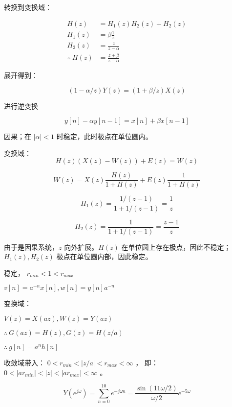 \documentclass[lang=cn,11pt,a4paper,cite=authoryear,twocolumn]{elegantpaper}
\begin{document}
转换到变换域：

\[\begin{aligned}
    H(z) &= H_1(z) H_2(z) +H_2(z)\\ 
    H_1(z) &= \beta \frac{1}{z} \\ 
    H_2(z) &= \frac{z}{z-\alpha} \\
    \therefore \: H(z) &= \frac{z + \beta}{z - \alpha}
\end{aligned}\]


展开得到：

\[(1-\alpha / z)Y(z) = (1 + \beta / z) X(z)\]

进行逆变换

\[y[n] - \alpha y[n-1] = x[n] + \beta x[n-1]\]


因果；在 \(|\alpha| < 1\) 时稳定，此时极点在单位圆内。



变换域：  \[H(z)(X(z)-W(z)) + E(z) = W(z)\]

\[W(z) = X(z) \frac{H(z)}{1+H(z)} + E(z) \frac{1}{1+H(z)}\]


\[H_1(z) = \frac{1/(z-1)}{1 + 1/(z-1)} = \frac{1}{z}\]

\[H_2(z) = \frac{1}{1 + 1 / (z-1)} = \frac{z-1}{z}\]


由于是因果系统，\(z\) 向外扩展。\(H(z)\) 在单位圆上存在极点，因此不稳定；\(H_1(z), H_2(z)\) 极点在单位圆内部，因此稳定。


 稳定， \(r_{min} < 1 < r_{max}\)

\(v[n] = a^{-n} x[n], w[n] = y[n] a^{-n}\)

变换域：

\(V(z) = X(az), W(z) = Y(az)\)

\(\therefore\: G(az) = H(z), G(z) = H(z/a)\)

\(\therefore\: g[n] = a^n h[n]\)


收敛域带入： \(0<r_{min}< |z/a| < r_{max} < \infty\) ， 即： \(0 < |a r_{min}| < |z| < |a r_{max}| < \infty\) 。


\[Y(e^{j \omega}) = \sum_{n=0}^{10} e^{-j\omega n } = \frac{\sin (11\omega/2)}{\omega/2} e^{-5\omega}\]
\end{document}
